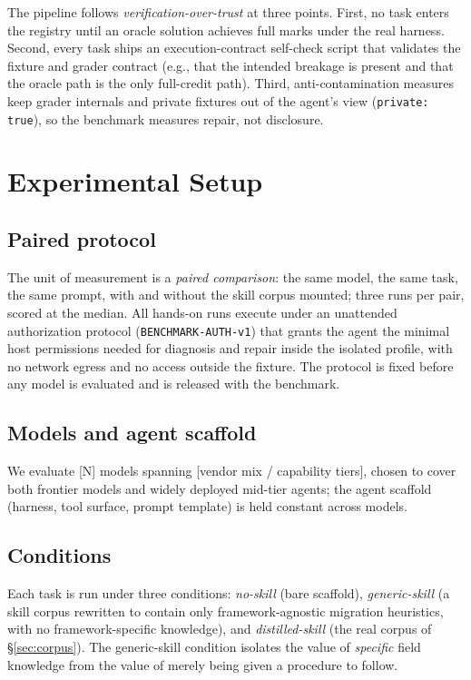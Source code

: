 \documentclass[11pt]{article}
\begin{document}
The pipeline follows \emph{verification-over-trust} at three points.
First, no task enters the registry until an oracle solution achieves full marks under the real harness.
Second, every task ships an execution-contract self-check script that validates the fixture and grader contract (e.g., that the intended breakage is present and that the oracle path is the only full-credit path).
Third, anti-contamination measures keep grader internals and private fixtures out of the agent's view (\texttt{private:\,true}), so the benchmark measures repair, not disclosure.

\section{Experimental Setup}
\label{sec:setup}

\subsection{Paired protocol}
\label{sec:protocol}

The unit of measurement is a \emph{paired comparison}: the same model, the same task, the same prompt, with and without the skill corpus mounted; three runs per pair, scored at the median.
All hands-on runs execute under an unattended authorization protocol (\texttt{BENCHMARK-AUTH-v1}) that grants the agent the minimal host permissions needed for diagnosis and repair inside the isolated profile, with no network egress and no access outside the fixture.
The protocol is fixed before any model is evaluated and is released with the benchmark.

\subsection{Models and agent scaffold}
\label{sec:models}

We evaluate [N] models spanning [vendor mix / capability tiers], chosen to cover both frontier models and widely deployed mid-tier agents; the agent scaffold (harness, tool surface, prompt template) is held constant across models.

\subsection{Conditions}
\label{sec:conditions}

Each task is run under three conditions: \emph{no-skill} (bare scaffold), \emph{generic-skill} (a skill corpus rewritten to contain only framework-agnostic migration heuristics, with no framework-specific knowledge), and \emph{distilled-skill} (the real corpus of \S\ref{sec:corpus}).
The generic-skill condition isolates the value of \emph{specific} field knowledge from the value of merely being given a procedure to follow.
\end{document}
